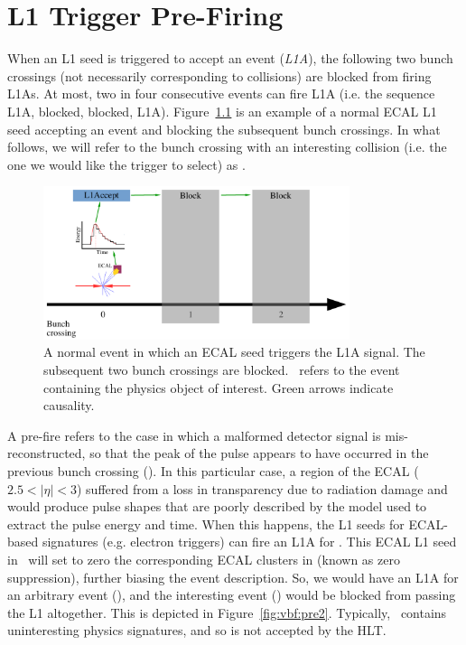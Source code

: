 \chapter{L1 Trigger Pre-Firing}
\label{sec:prefire}

When an L1 seed is triggered to accept an event (\emph{L1A}), the following two bunch crossings (not necessarily corresponding to collisions) are blocked from firing L1As. 
At most, two in four consecutive events can fire L1A (i.e. the sequence L1A, blocked, blocked, L1A).
Figure~\ref{fig:vbf:pre1} is an example of a normal ECAL L1 seed accepting an event and blocking the subsequent bunch crossings.
In what follows, we will refer to the bunch crossing with an interesting collision (i.e. the one we would like the trigger to select) as .

\begin{figure}
    \begin{center}
        \includegraphics[width=0.8\textwidth,page=1]{figures/vbf/triggers/l1diag.pdf}
        \caption{A normal event in which an ECAL seed triggers the L1A signal. 
                 The subsequent two bunch crossings are blocked. 
                 ~refers to the event containing the physics object of interest.
                 Green arrows indicate causality.}
        \label{fig:vbf:pre1}
    \end{center}
\end{figure}

A pre-fire refers to the case in which a malformed detector signal is mis-reconstructed, so that the peak of the pulse appears to have occurred in the previous bunch crossing ().   
In this particular case, a region of the ECAL ($2.5 < |\eta|<3$) suffered from a loss in transparency due to radiation damage and would produce pulse shapes that are poorly described by the model used to extract the pulse energy and time. 
When this happens, the L1 seeds for ECAL-based signatures (e.g. electron triggers) can fire an L1A for .
This ECAL L1 seed in ~will set to zero the corresponding ECAL clusters in  (known as zero suppression), further biasing the event description.
So, we would have an L1A for an arbitrary event (), and the interesting event () would be blocked from passing the L1 altogether. 
This is depicted in Figure~\ref{fig:vbf:pre2}.
Typically, ~contains uninteresting physics signatures, and so is not accepted by the HLT.

